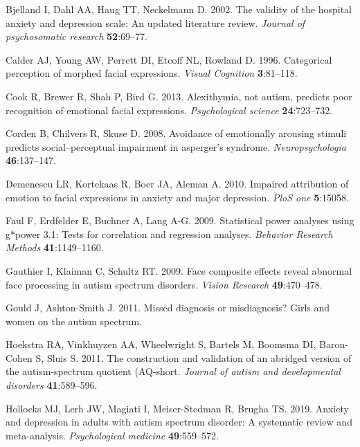\documentclass[
]{article}
\newlength{\cslhangindent}
\newlength{\cslentryspacingunit} %
\newenvironment{CSLReferences}[2] %
 {%
  \setlength{\parindent}{0pt}
  \ifodd #1
  \let\oldpar\par
  \def\par{\hangindent=\cslhangindent\oldpar}
  \fi
  \setlength{\parskip}{#2\cslentryspacingunit}
 }%
 {}
\begin{document}
\begin{CSLReferences}{1}{0}
\leavevmode{}%
Bjelland I, Dahl AA, Haug TT, Neckelmann D. 2002. The validity of the hospital anxiety and depression scale: An updated literature review. \emph{Journal of psychosomatic research} \textbf{52}:69--77.

\leavevmode{}%
Calder AJ, Young AW, Perrett DI, Etcoff NL, Rowland D. 1996. Categorical perception of morphed facial expressions. \emph{Visual Cognition} \textbf{3}:81--118.

\leavevmode{}%
Cook R, Brewer R, Shah P, Bird G. 2013. Alexithymia, not autism, predicts poor recognition of emotional facial expressions. \emph{Psychological science} \textbf{24}:723--732.

\leavevmode{}%
Corden B, Chilvers R, Skuse D. 2008. Avoidance of emotionally arousing stimuli predicts social--perceptual impairment in asperger's syndrome. \emph{Neuropsychologia} \textbf{46}:137--147.

\leavevmode{}%
Demenescu LR, Kortekaas R, Boer JA, Aleman A. 2010. Impaired attribution of emotion to facial expressions in anxiety and major depression. \emph{PloS one} \textbf{5}:15058.

\leavevmode{}%
Faul F, Erdfelder E, Buchner A, Lang A-G. 2009. Statistical power analyses using g*power 3.1: Tests for correlation and regression analyses. \emph{Behavior Research Methods} \textbf{41}:1149--1160.

\leavevmode{}%
Gauthier I, Klaiman C, Schultz RT. 2009. Face composite effects reveal abnormal face processing in autism spectrum disorders. \emph{Vision Research} \textbf{49}:470--478.

\leavevmode{}%
Gould J, Ashton-Smith J. 2011. Missed diagnosis or misdiagnosis? Girls and women on the autism spectrum.

\leavevmode{}%
Hoekstra RA, Vinkhuyzen AA, Wheelwright S, Bartels M, Boomsma DI, Baron-Cohen S, Sluis S. 2011. The construction and validation of an abridged version of the autism-spectrum quotient (AQ-short. \emph{Journal of autism and developmental disorders} \textbf{41}:589--596.

\leavevmode{}%
Hollocks MJ, Lerh JW, Magiati I, Meiser-Stedman R, Brugha TS. 2019. Anxiety and depression in adults with autism spectrum disorder: A systematic review and meta-analysis. \emph{Psychological medicine} \textbf{49}:559--572.


\end{CSLReferences}
\end{document}
